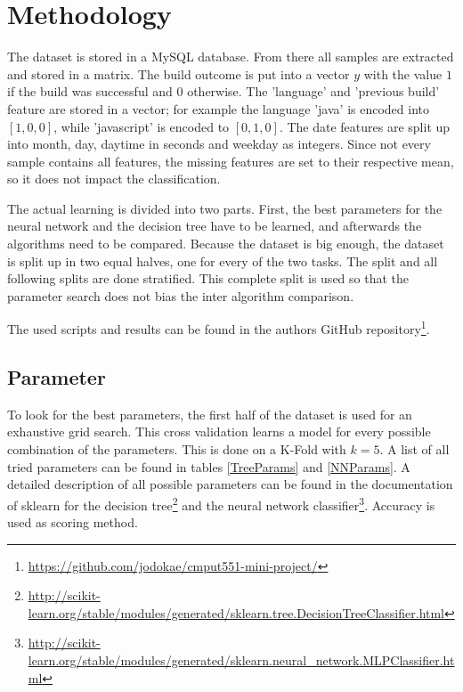 \documentclass[a4paper,11pt]{article}
\begin{document}

\section{Methodology}

The dataset is stored in a MySQL database. From there all samples are extracted and stored in a matrix. The build outcome is put into a vector $y$ with the value $1$ if the build was successful and $0$ otherwise. The 'language' and 'previous build' feature are stored in a vector; for example the language 'java' is encoded into $[1,0,0]$, while 'javascript' is encoded to $[0,1,0]$. The date features are split up into month, day, daytime in seconds and weekday as integers. 
Since not every sample contains all features, the missing features are set to their respective mean, so it does not impact the classification.

The actual learning is divided into two parts. First, the best parameters for the neural network and the decision tree have to be learned, and afterwards the algorithms need to be compared. Because the dataset is big enough, the dataset is split up in two equal halves, one for every of the two tasks. The split and all following splits are done stratified. This complete split is used so that the parameter search does not bias the inter algorithm comparison. 

The used scripts and results can be found in the authors GitHub repository\footnote{\url{https://github.com/jodokae/cmput551-mini-project/}}.



\subsection{Parameter}

To look for the best parameters, the first half of the dataset is used for an exhaustive grid search. This cross validation learns a model for every possible combination of the parameters. This is done on a K-Fold with $k=5$. A list of all tried parameters can be found in tables \ref{TreeParams} and \ref{NNParams}. 
A detailed description of all possible parameters can be found in the documentation of sklearn for the decision tree\footnote{\url{http://scikit-learn.org/stable/modules/generated/sklearn.tree.DecisionTreeClassifier.html}} and the neural network classifier\footnote{\url{http://scikit-learn.org/stable/modules/generated/sklearn.neural_network.MLPClassifier.html}}. 
Accuracy is used as scoring method. 
\end{document}
